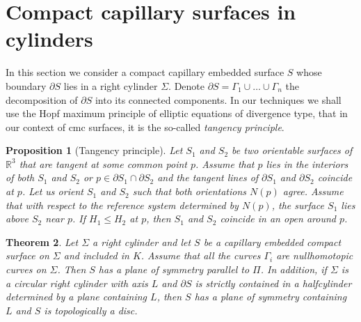 \documentclass[12pt,a4paper]{amsart}
\newtheorem{theorem}{Theorem}
\newtheorem{proposition}[theorem]{Proposition}
\begin{document}
\section{ Compact capillary surfaces in cylinders}\label{sec4}
In this section we consider a compact capillary embedded surface $S$ whose boundary $\partial S$ lies in a right cylinder $\Sigma$. Denote $\partial S=\Gamma_1\cup\ldots\cup\Gamma_n$ the decomposition of $\partial S$ into its connected components.
In our techniques we shall use the Hopf maximum principle of elliptic equations of divergence type, that in our context of cmc surfaces, it is the so-called {\it tangency principle}.
\begin{proposition}[Tangency principle] Let $S_1$ and $S_2$ be two orientable surfaces of ${\mathbb R}^3$ that are tangent at some common point $p$. Assume that $p$ lies in the interiors of both $S_1$ and $S_2$ or $p\in\partial S_1\cap\partial S_2$ and the tangent lines of $\partial S_1$ and $\partial S_2$ coincide at $p$. Let us orient $S_1$ and $S_2$ such that both orientations $N(p)$ agree. Assume that with respect to the reference system determined by $N(p)$, the surface $S_1$ lies above $S_2$ near $p$. If $H_1\leq H_2$ at $p$, then $S_1$ and $S_2$ coincide in an open around $p$.
\end{proposition}
\begin{theorem}\label{t1} Let $\Sigma$ a right cylinder and let $S$ be a capillary embedded compact surface on $\Sigma$ and included in $K$. Assume that all the curves $\Gamma_i$ are nullhomotopic curves on $\Sigma$. Then $S$ has a plane of symmetry parallel to $\Pi$. In addition, if $\Sigma$ is a circular right cylinder with axis $L$ and $\partial S$ is strictly contained in a halfcylinder determined by a plane containing $L$, then $S$ has a plane of symmetry containing $L$ and $S$ is topologically a disc.
\end{theorem}
\end{document}
